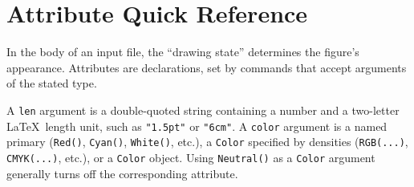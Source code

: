 \documentclass[12pt,letterpaper]{book}
\newcommand{\code}[1]{\texttt{#1}}
\begin{document}
\section{Attribute Quick Reference}
\label{section-quickref}

In the body of an input file, the ``drawing state'' determines the
figure's appearance. Attributes are declarations, set by commands that
accept arguments of the stated type.

A \code{len} argument is a double-quoted string containing a number
and a two-letter \LaTeX\ length unit, such as \code{"1.5pt"} or
\code{"6cm"}. A \code{color} argument is a named primary
(\code{Red()}, \code{Cyan()}, \code{White()}, etc.), a \code{Color}
specified by densities (\code{RGB(...)}, \code{CMYK(...)}, etc.), or a
\code{Color} object. Using \code{Neutral()} as a \code{Color} argument
generally turns off the corresponding attribute.
\end{document}
